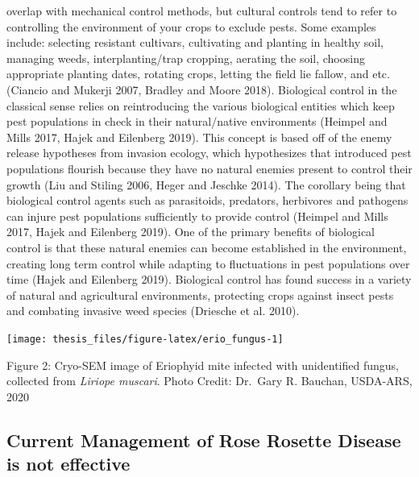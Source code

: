 \documentclass[12pt,final,CPage]{ufthesis}
\begin{document}
{overlap with mechanical control methods, but cultural controls tend to refer to controlling the environment of your crops to exclude pests. Some examples include: selecting resistant cultivars, cultivating and planting in healthy soil, managing weeds, interplanting/trap cropping, aerating the soil, choosing appropriate planting dates, rotating crops, letting the field lie fallow, and etc. (Ciancio and Mukerji 2007, Bradley and Moore 2018). Biological control in the classical sense relies on reintroducing the various biological entities which keep pest populations in check in their natural/native environments (Heimpel and Mills 2017, Hajek and Eilenberg 2019). This concept is based off of the enemy release hypotheses from invasion ecology, which hypothesizes that introduced pest populations flourish because they have no natural enemies present to control their growth (Liu and Stiling 2006, Heger and Jeschke 2014). The corollary being that biological control agents such as parasitoids, predators, herbivores and pathogens can injure pest populations sufficiently to provide control (Heimpel and Mills 2017, Hajek and Eilenberg 2019). One of the primary benefits of biological control is that these natural enemies can become established in the environment, creating long term control while adapting to fluctuations in pest populations over time (Hajek and Eilenberg 2019). Biological control has found success in a variety of natural and agricultural environments, protecting crops against insect pests and combating invasive weed species (Driesche et al. 2010).
  \begin{center}\texttt{[image: thesis\_files/figure-latex/erio\_fungus-1]} \end{center}

  Figure 2: Cryo-SEM image of Eriophyid mite infected with unidentified fungus, collected from \emph{Liriope muscari}. Photo Credit: Dr.~Gary R. Bauchan, USDA-ARS, 2020

  \hypertarget{ipm-erios-litrev}{%
  \subsection{Current Management of Rose Rosette Disease is not effective}\label{ipm-erios-litrev}}

}
\end{document}
